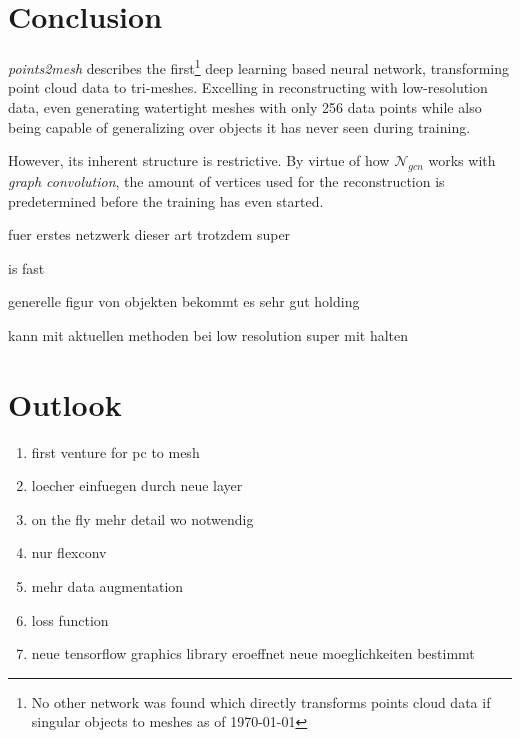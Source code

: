 \section{Conclusion}


\emph{points2mesh} describes the first\footnote{No other network was found which directly transforms points cloud data if singular objects to meshes as of \today} deep
learning based neural network, transforming point cloud data to tri-meshes. Excelling in reconstructing with low-resolution data,
 even generating watertight meshes with only 256 data points while also being capable of generalizing over objects it has never seen 
 during training.

However, its inherent structure is restrictive. By virtue of how $\mathcal{N}_{gcn}$ works with \emph{graph convolution}, the amount
 of vertices used for the reconstruction is predetermined before the training has even started. 

fuer erstes netzwerk dieser art trotzdem super

 is fast

 generelle figur von objekten bekommt es sehr gut holding


 kann mit aktuellen methoden bei low resolution super mit halten


\section{Outlook}

\begin{enumerate}
  \item first venture for pc to mesh
  \item loecher einfuegen durch neue layer
  \item on the fly mehr detail wo notwendig
  \item nur flexconv
  \item mehr data augmentation
  \item loss function
  \item neue tensorflow graphics library eroeffnet neue moeglichkeiten bestimmt
\end{enumerate}